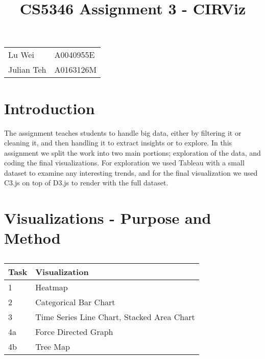 \documentclass{article}
\begin{document}
\raggedright

\newcommand{\insertimage}[1]{ \begin{center} \texttt{[image: \#1]} \end{center} }

\title{ CS5346 Assignment 3 - CIRViz }

\maketitle

\begin{center}
\begin{tabular} { l | l }
    Lu Wei & A0040955E \\
    Julian Teh & A0163126M
\end{tabular}
\end{center}

\pagebreak

\tableofcontents

\pagebreak

\section{Introduction}
The assignment teaches students to handle big data, either by filtering it or cleaning it, and then handling it to extract insights or to explore. In this assignment we split the work into two main portions; exploration of the data, and coding the final visualizations. For exploration we used Tableau with a small dataset to examine any interesting trends, and for the final visualization we used C3.js on top of D3.js to render with the full dataset. 

\section{Visualizations - Purpose and Method}

\subsection{}
\begin{tabular} { l | l }
    Task & Visualization\\
    \hline
    1 & Heatmap\\
    2 & Categorical Bar Chart \\
    3 & Time Series Line Chart, Stacked Area Chart \\
    4a & Force Directed Graph\\
    4b & Tree Map
\end{tabular}
\end{document}
